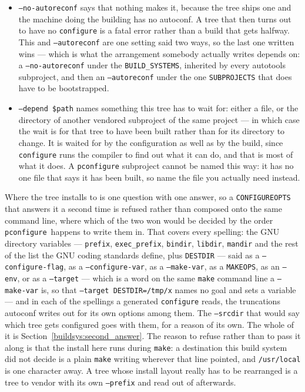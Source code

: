 \documentclass{article}
\newcommand{\pconfigure}{\texttt{pconfigure}}
\begin{document}
\begin{itemize}
\item \texttt{--no-autoreconf} says that nothing makes it, because the
  tree ships one and the machine doing the building has no autoconf.
  A tree that then turns out to have no \texttt{configure} is a fatal
  error rather than a build that gets halfway.  This and
  \texttt{--autoreconf} are one setting said two ways, so the last one
  written wins --- which is what the arrangement somebody actually
  writes depends on: a \texttt{--no-autoreconf} under the
  \texttt{BUILD\_SYSTEMS}, inherited by every autotools subproject,
  and then an \texttt{--autoreconf} under the one
  \texttt{SUBPROJECTS} that does have to be bootstrapped.

\item \texttt{--depend \$path} names something this tree has to wait
  for: either a file, or the directory of another vendored subproject
  of the same project --- in which case the wait is for that tree to
  have been built rather than for its directory to change.  It is
  waited for by the configuration as well as by the build, since
  \texttt{configure} runs the compiler to find out what it can do, and
  that is most of what it does.  A \texttt{pconfigure} subproject
  cannot be named this way: it has no one file that says it has been
  built, so name the file you actually need instead.
\end{itemize}

Where the tree installs to is one question with one answer, so a
\texttt{CONFIGUREOPTS} that answers it a second time is refused rather
than composed onto the same command line, where which of the two won
would be decided by the order \pconfigure\ happens to write them in.
That covers every spelling: the GNU directory variables ---
\texttt{prefix}, \texttt{exec\_prefix}, \texttt{bindir},
\texttt{libdir}, \texttt{mandir} and the rest of the list the GNU
coding standards define, plus \texttt{DESTDIR} --- said as a
\texttt{--configure-flag}, as a \texttt{--configure-var}, as a
\texttt{--make-var}, as a \texttt{MAKEOPS}, as an \texttt{--env}, or
as a \texttt{--target} --- which is a word on the same
\texttt{make} command line a \texttt{--make-var} is, so that
\texttt{--target DESTDIR=/tmp/x} names no goal and sets a variable
---
and in each of the spellings a generated \texttt{configure} reads,
the truncations autoconf writes out for its own options among them.
The \texttt{--srcdir} that would say which tree gets configured goes
with them, for a reason of its own.  The whole of it is
Section~\ref{buildsys:second_answer}.  The reason to refuse
rather than to pass it along is that the install here runs during
\texttt{make}: a destination this build system did not decide is a
plain \texttt{make} writing wherever that line pointed, and
\texttt{/usr/local} is one character away.  A tree whose install
layout really has to be rearranged is a tree to vendor with its own
\texttt{--prefix} and read out of afterwards.
\end{document}

